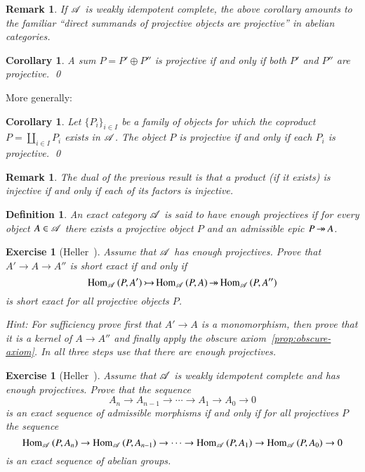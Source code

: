 \documentclass[1p]{elsarticle}
\theoremstyle{mythm}
\newtheorem{Cor}[Thm]{Corollary}
\theoremstyle{mydef}
\newtheorem{Exer}[Thm]{Exercise}
\newtheorem{Rem}[Thm]{Remark}
\newtheorem{Def}[Thm]{Definition}
\begin{document}
\begin{Rem}
  If $\operatorname{\mathscr{A}}$ is weakly idempotent complete, the above corollary
  amounts to the familiar ``direct summands of projective objects are
  projective'' in abelian categories.
\end{Rem}

\begin{Cor}
  A sum $P = P' \oplus P''$ is projective if and only if
  both $P'$ and $P''$ are projective. \qed
\end{Cor}

More generally:

\begin{Cor}
  Let $\{P_{i}\}_{i \in I}$ be a family of objects for which the
  coproduct $P = \coprod_{i \in I} P_{i}$ exists in $\operatorname{\mathscr{A}}$. 
  The object $P$ is projective if and only if each $P_{i}$ is
  projective. \qed
\end{Cor}

\begin{Rem}
  The dual of the previous result is that a product (if it
  exists) is injective if and only if each of its factors is injective.
\end{Rem}

\begin{Def}
  \label{def:enough-projectives}
  An exact category $\operatorname{\mathscr{A}}$ is said to have \emph{enough projectives}
  if for every object $A \in \operatorname{\mathscr{A}}$ there exists a projective object
  $P$ and an admissible epic $P \operatorname{\twoheadrightarrow} A$.
\end{Def}

\begin{Exer}[{Heller~\cite[5.6]{MR0100622}}]
  Assume that $\operatorname{\mathscr{A}}$ has enough projectives. Prove that $A' \to A \to
  A''$ is short exact if and only if
  \[
  \operatorname{Hom}_{\operatorname{\mathscr{A}}}{(P,A')} \operatorname{\rightarrowtail} \operatorname{Hom}_{\operatorname{\mathscr{A}}}{(P,A)} \operatorname{\twoheadrightarrow}
  \operatorname{Hom}_{\operatorname{\mathscr{A}}}{(P,A'')}
  \]
  is short exact for all projective objects $P$.

  \emph{Hint:} For sufficiency prove first that $A' \to A$ is a
  monomorphism, then prove that it is a kernel of $A \to A''$ and finally
  apply the obscure axiom~\ref{prop:obscure-axiom}. 
  In all three steps use that there are enough projectives.
\end{Exer}
 
\begin{Exer}[{Heller~\cite[5.6]{MR0100622}}]
  Assume that $\operatorname{\mathscr{A}}$ is weakly idempotent complete and has enough
  projectives. Prove that the sequence
  \[
  A_{n} \to A_{n-1} \to \cdots \to A_{1} \to A_{0} \to 0
  \]
  is an exact sequence of admissible morphisms if and only if for all
  projectives $P$ the sequence
  \[
  \operatorname{Hom}_{\operatorname{\mathscr{A}}}{(P, A_{n})} \to \operatorname{Hom}_{\operatorname{\mathscr{A}}}{(P,A_{n-1})} \to \cdots 
  \to \operatorname{Hom}_{\operatorname{\mathscr{A}}}{(P,A_{1})} \to \operatorname{Hom}_{\operatorname{\mathscr{A}}}{(P,A_{0})} \to 0
  \]
  is an exact sequence of abelian groups.
\end{Exer}
\end{document}
